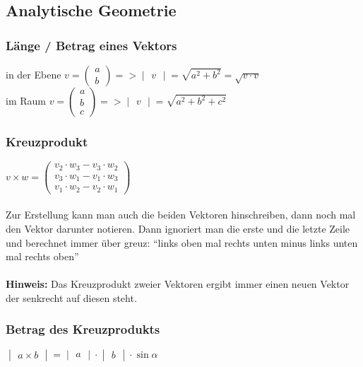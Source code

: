 \documentclass[6pt,a4paper]{scrartcl}
\begin{document}
\begin{multicols*}{3}
\subsection{Analytische Geometrie}
\subsubsection{Länge / Betrag eines Vektors}
in der Ebene $
v = \begin{pmatrix}a \\ b\end{pmatrix} => \begin{vmatrix}v\end{vmatrix} = \sqrt{a^2 + b^2} = \sqrt{v \cdot v}
$\\
im Raum $
v = \begin{pmatrix}a \\ b \\ c\end{pmatrix} => \begin{vmatrix}v\end{vmatrix} = \sqrt{a^2 + b^2 + c^2}
$
\subsubsection{Kreuzprodukt}
$v \times w = \begin{pmatrix}
v_2 \cdot w_3 - v_3 \cdot w_2 \\
v_3 \cdot w_1 - v_1 \cdot w_3 \\
v_1 \cdot w_2 - v_2 \cdot w_1
\end{pmatrix}$
\\
\\
Zur Erstellung kann man auch die beiden Vektoren hinschreiben, dann noch mal den Vektor darunter notieren. Dann ignoriert man die erste und die letzte Zeile und berechnet immer über greuz: ``links oben mal rechts unten minus links unten mal rechts oben''\\
\\
\textbf{Hinweis:} Das Kreuzprodukt zweier Vektoren ergibt immer einen neuen Vektor der senkrecht auf diesen steht.\\
\subsubsection{Betrag des Kreuzprodukts}
$\begin{vmatrix}a \times b\end{vmatrix} = \begin{vmatrix}a\end{vmatrix} \cdot \begin{vmatrix}b\end{vmatrix} \cdot \sin \alpha$\\

\end{multicols*}
\end{document}

